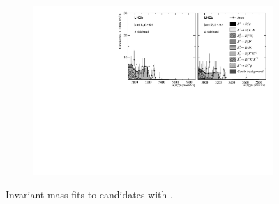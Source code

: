 \begin{figure}[!h]
\begin{subfigure}[t]{1.0\textwidth}
    \end{subfigure}
    \begin{subfigure}[t]{1.0\textwidth}
        \centering
        \includegraphics[width=1.0\textwidth]{figs/Appendix_FitCategories/canvas_DsPhiSide_Ds2PhiPi_both_summed_splitHel_splitKKPi_s21_s21r1_s24_s26.pdf}\\
    \end{subfigure}
    \caption{Invariant mass fits to \decay{\Bp}{\Dsp\phiz} candidates with \decay{\Dsp}{\phiz\pip}.}
\end{figure}

